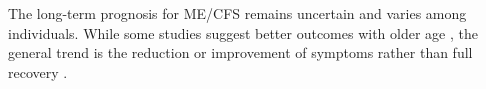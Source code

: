 The long-term prognosis for ME/CFS remains uncertain and varies among individuals. 
While some studies suggest better outcomes with older age \citep{ghali2022FactorsInfluencing}, the general trend is the reduction or improvement of symptoms rather than full recovery \citep{carruthers2011MyalgicEncephalomyelitis, nacul2021EuropeanNetwork}.








